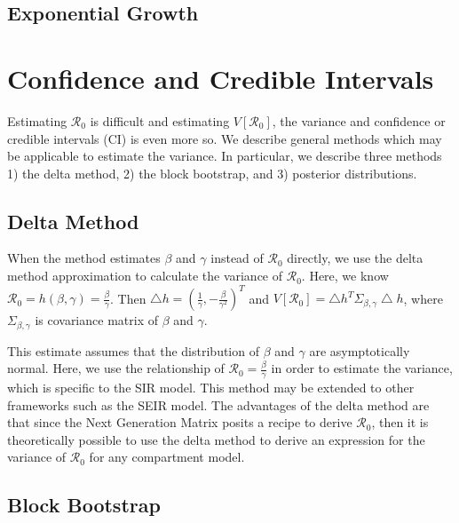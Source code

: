 \documentclass[12pt]{article}
\newcommand{\rr}{\ensuremath{\mathcal{R}_0}}
\begin{document}
\subsection{Exponential Growth}\label{sec:expgrowth}



\section{Confidence and Credible Intervals}
\label{sec:ci}

Estimating $\rr$ is difficult and estimating $V[\rr]$, the variance and confidence or credible intervals (CI) is even more so.  We describe general methods which may be applicable to estimate the variance.  In particular, we describe three methods 1) the delta method, 2) the block bootstrap, and 3) posterior distributions.


\subsection{Delta Method}\label{delta-method}

When the method estimates \(\beta\) and \(\gamma\) instead of \(\rr\) directly, we use the delta method approximation to calculate the
variance of \(\rr\). Here, we know \(\rr = h(\beta, \gamma) = \frac{\beta}{\gamma}\). Then \(\bigtriangleup h = (\frac{1}{\gamma},  -\frac{\beta}{\gamma^2})^T\) and \(V[\rr] = \bigtriangleup h^T \Sigma_{\beta, \gamma} \bigtriangleup h\), where \(\Sigma_{\beta, \gamma}\) is covariance matrix of \(\beta\) and \(\gamma\).

This estimate assumes that the distribution of $\beta$ and $\gamma$ are asymptotically normal.  Here, we use the relationship of $\rr = \frac{\beta}{\gamma}$ in order to estimate the variance, which is specific to the SIR model.  This method may be extended to other frameworks such as the SEIR model.  The advantages of the delta method are that since the Next Generation Matrix \citep{diekmann2009} posits a recipe to derive $\rr$, then it is theoretically possible to use the delta method to derive an expression for the variance of $\rr$ for any compartment model.

\subsection{Block Bootstrap}
\end{document}
